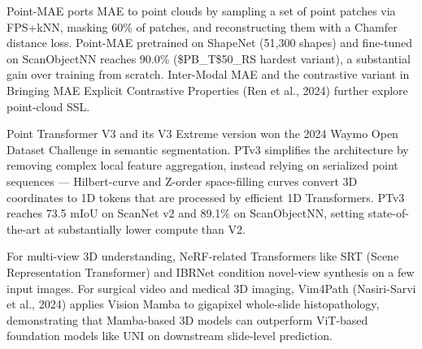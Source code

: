 \documentclass{article}
\begin{document}
Point-MAE \citep{pang2022maskedautoencoders} ports MAE to point clouds by sampling a set of point patches via FPS+kNN, masking 60\% of patches, and reconstructing them with a Chamfer distance loss. Point-MAE pretrained on ShapeNet (51,300 shapes) and fine-tuned on ScanObjectNN reaches 90.0\% (\$PB\_T\$50\_RS hardest variant), a substantial gain over training from scratch. Inter-Modal MAE \citep{liu2022aconvnetforthe2020} and the contrastive variant in Bringing MAE Explicit Contrastive Properties (Ren et al., 2024) further explore point-cloud SSL.

Point Transformer V3 \citep{wu2023revisitingclassifi} and its V3 Extreme version \citep{wu2023revisitingclassifi} won the 2024 Waymo Open Dataset Challenge in semantic segmentation. PTv3 simplifies the architecture by removing complex local feature aggregation, instead relying on serialized point sequences --- Hilbert-curve and Z-order space-filling curves convert 3D coordinates to 1D tokens that are processed by efficient 1D Transformers. PTv3 reaches 73.5 mIoU on ScanNet v2 and 89.1\% on ScanObjectNN, setting state-of-the-art at substantially lower compute than V2.

For multi-view 3D understanding, NeRF-related Transformers like SRT (Scene Representation Transformer) and IBRNet condition novel-view synthesis on a few input images. For surgical video and medical 3D imaging, Vim4Path (Nasiri-Sarvi et al., 2024) applies Vision Mamba to gigapixel whole-slide histopathology, demonstrating that Mamba-based 3D models can outperform ViT-based foundation models like UNI on downstream slide-level prediction.
\end{document}
